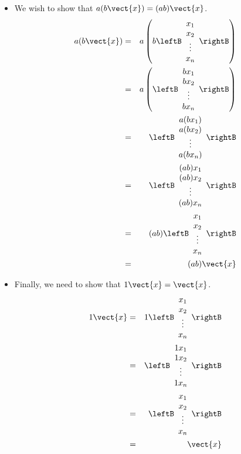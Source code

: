 \begin{solution}
\begin{itemize}
\item
We wish to show that $a(b\vect{x}) = (ab) \vect{x}$. 
\begin{eqnarray*}
a(b\vect{x}) &=& 
a\left(b \leftB \begin{array}{c}
x_1 \\
x_2 \\
\vdots \\
x_n
\end{array}
\rightB \right) \\
&=& a\left(
\leftB \begin{array}{c}
bx_1 \\
bx_2 \\
\vdots \\
bx_n
\end{array}
\rightB \right) \\
&=&
\leftB \begin{array}{c}
a(bx_1) \\
a(bx_2) \\
\vdots \\
a(bx_n)
\end{array}
\rightB \\
&=&
\leftB \begin{array}{c}
(ab)x_1 \\
(ab)x_2 \\
\vdots \\
(ab)x_n
\end{array}
\rightB \\
&=& (ab)
\leftB \begin{array}{c}
x_1 \\
x_2 \\
\vdots \\
x_n
\end{array}
\rightB \\
&=& (ab)\vect{x}
\end{eqnarray*}

\item
Finally, we need to show that $1\vect{x} = \vect{x}$.
\begin{eqnarray*}
1\vect{x} &=& 1 \leftB \begin{array}{c}
x_1 \\
x_2 \\
\vdots \\
x_n
\end{array}
\rightB \\
&=&
\leftB \begin{array}{c}
1x_1 \\
1x_2 \\
\vdots \\
1x_n
\end{array}
\rightB \\
&=& 
\leftB \begin{array}{c}
x_1 \\
x_2 \\
\vdots \\
x_n
\end{array}
\rightB \\
&=& \vect{x}
\end{eqnarray*}
\end{itemize}


\end{solution}
